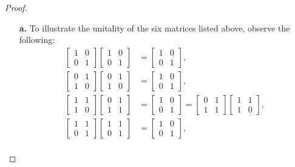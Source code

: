 \documentclass[ 12pt ]{article}
\begin{document}
\begin{enumerate}
		\begin{proof} $ $
			\begin{enumerate}
				\item[\textbf{a.}] To illustrate the unitality of the six matrices listed above, observe the following:
				\begin{align*}
					\begin{bmatrix} 1 & 0 \\ 0 & 1 \end{bmatrix} \begin{bmatrix} 1 & 0 \\ 0 & 1 \end{bmatrix} &= \begin{bmatrix} 1 & 0 \\ 0 & 1 \end{bmatrix}, \\
					\begin{bmatrix} 0 & 1 \\ 1 & 0 \end{bmatrix} \begin{bmatrix} 0 & 1 \\ 1 & 0 \end{bmatrix} &= \begin{bmatrix} 1 & 0 \\ 0 & 1 \end{bmatrix}, \\
					\begin{bmatrix} 1 & 1 \\ 1 & 0 \end{bmatrix} \begin{bmatrix} 0 & 1 \\ 1 & 1 \end{bmatrix} &= \begin{bmatrix} 1 & 0 \\ 0 & 1 \end{bmatrix} = \begin{bmatrix} 0 & 1 \\ 1 & 1 \end{bmatrix} \begin{bmatrix} 1 & 1 \\ 1 & 0 \end{bmatrix}, \\
					\begin{bmatrix} 1 & 1 \\ 0 & 1 \end{bmatrix} \begin{bmatrix} 1 & 1 \\ 0 & 1 \end{bmatrix} &= \begin{bmatrix} 1 & 0 \\ 0 & 1 \end{bmatrix}, \\

\end{align*}
\end{enumerate}
\end{proof}
\end{enumerate}
\end{document}
